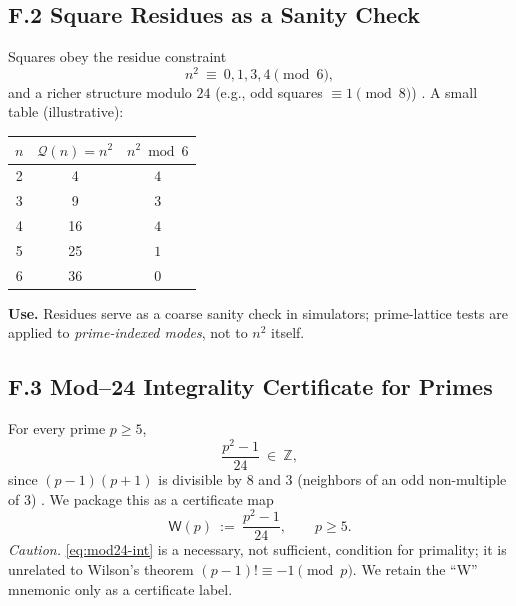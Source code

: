 \documentclass[12pt]{amsart}
\theoremstyle{plain}
\begin{document}
\subsection*{F.2 Square Residues as a Sanity Check}
Squares obey the residue constraint
\[
n^{2}\ \equiv\ 0,1,3,4\pmod{6},
\]
and a richer structure modulo $24$ (e.g., odd squares $\equiv 1\pmod{8}$) \cite[Ch.~2]{hardy2008introduction}. A small table (illustrative):
\begin{center}
\begin{tabular}{c|c|c}
$n$ & $\mathcal{Q}(n)=n^{2}$ & $n^{2}\bmod 6$ \\
\hline
2 & 4  & $4$ \\
3 & 9  & $3$ \\
4 & 16 & $4$ \\
5 & 25 & $1$ \\
6 & 36 & $0$ \\
\end{tabular}
\end{center}
\noindent
\textbf{Use.} Residues serve as a coarse sanity check in simulators; prime-lattice tests are applied to \emph{prime-indexed modes}, not to $n^{2}$ itself.

\subsection*{F.3 Mod–24 Integrality Certificate for Primes}
For every prime $p\ge5$,
\begin{equation}
\frac{p^{2}-1}{24}\ \in\ \mathbb{Z},
\label{eq:mod24-int}
\end{equation}
since $(p-1)(p+1)$ is divisible by $8$ and $3$ (neighbors of an odd non-multiple of $3$) \cite[Ch.~5]{hardy2008introduction}. We package this as a certificate map
\[
\mathsf{W}(p)\ :=\ \frac{p^{2}-1}{24},\qquad p\ge5.
\]
\emph{Caution.} \eqref{eq:mod24-int} is a necessary, not sufficient, condition for primality; it is unrelated to Wilson’s theorem $({p-1})!\equiv-1\pmod p$. We retain the “W” mnemonic only as a certificate label.
\end{document}
